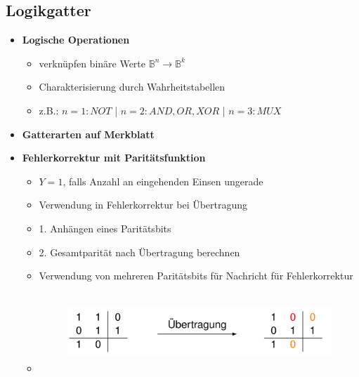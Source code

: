 \documentclass[11pt,a4paper]{article}
\begin{document}
\subsection{Logikgatter}
\begin{itemize}

\item \textbf{Logische Operationen}
	\begin{itemize}
	\item verknüpfen binäre Werte $\mathbb{B}^n \rightarrow \mathbb{B}^k$
	\item Charakterisierung durch Wahrheitstabellen
	\item z.B.: $n = 1: NOT$ | $n = 2: AND, OR,XOR$ | $n = 3: MUX$
	\end{itemize}

\item \textbf{Gatterarten auf Merkblatt}

\item \textbf{Fehlerkorrektur mit Paritätsfunktion}
	\begin{itemize}
	\item $Y = 1$, falls Anzahl an eingehenden Einsen ungerade
	\item Verwendung in Fehlerkorrektur bei Übertragung
	\item 1. Anhängen eines Paritätsbits 
	\item 2. Gesamtparität nach Übertragung berechnen
	\item Verwendung von mehreren Paritätsbits für Nachricht für Fehlerkorrektur
	\item[] 	
		\begin{figure}[H]
		\begin{center}
		\includegraphics[height=3cm]{fehlerpari}
		\end{center}
		\end{figure}
	\end{itemize}

\end{itemize}

\pagebreak
\end{document}
